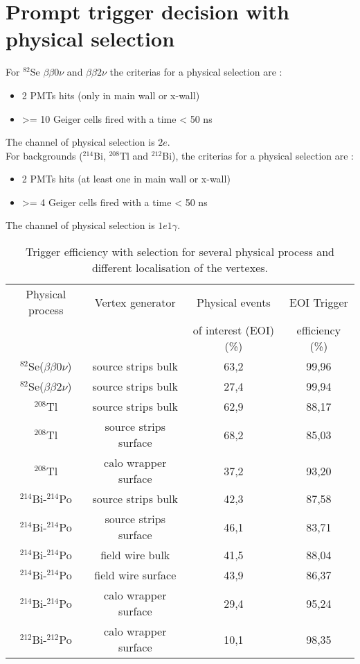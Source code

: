 \documentclass[12pt,a4paper]{article}
\newcommand{\BBZN}{$\beta\beta{}0\nu$}
\newcommand{\BBDN}{$\beta\beta{}2\nu$}
\newcommand{\SE}{$^{82}$Se}
\newcommand{\TL}{$^{208}$Tl}
\newcommand{\BIQ}{$^{214}$Bi}
\newcommand{\BID}{$^{212}$Bi}
\newcommand{\POQ}{$^{214}$Po}
\newcommand{\POD}{$^{212}$Po}
\begin{document}
\section{Prompt trigger decision with physical selection}	
For \SE{} \BBZN{} and \BBDN{} the criterias for a physical selection are : 
\begin{itemize}
 \item 2 PMTs hits (only in main wall or x-wall)
 \item >= 10 Geiger cells fired with a time < 50 ns
\end{itemize}
The channel of physical selection is $2e$.\\

For backgrounds (\BIQ, \TL{} and \BID), the criterias for a physical selection are :
\begin{itemize}
 \item 2 PMTs hits (at least one in main wall or x-wall)
 \item >= 4 Geiger cells fired with a time < 50 ns
\end{itemize}
The channel of physical selection is $1e1\gamma$.

\begin{table}[!h]
 \begin{center}
  \begin{tabular}{|c||c|c|c|}
    \hline
    Physical process   & Vertex generator      & Physical events        &  EOI Trigger      \\
	               &                       & of interest (EOI) (\%) &  efficiency (\%)  \\
    \hline
    \SE(\BBZN)         & source strips bulk    & 63,2                   & 99,96   \\
    \SE(\BBDN)         & source strips bulk    & 27,4                   & 99,94   \\
    \TL                & source strips bulk    & 62,9                   & 88,17   \\
    \TL                & source strips surface & 68,2                   & 85,03   \\
    \TL                & calo wrapper surface  & 37,2                   & 93,20   \\
    \BIQ-\POQ          & source strips bulk    & 42,3                   & 87,58   \\
    \BIQ-\POQ          & source strips surface & 46,1                   & 83,71   \\
    \BIQ-\POQ          & field wire bulk       & 41,5                   & 88,04   \\
    \BIQ-\POQ          & field wire surface    & 43,9                   & 86,37   \\
    \BIQ-\POQ          & calo wrapper surface  & 29,4                   & 95,24   \\
    \BID-\POD          & calo wrapper surface  & 10,1                   & 98,35   \\
    
    \hline
  \end{tabular}
  \end{center}
  \caption{Trigger efficiency with selection for several physical process and different localisation of the vertexes.}
\label{poi_efficacity_trigger}
\end{table}
\end{document}
